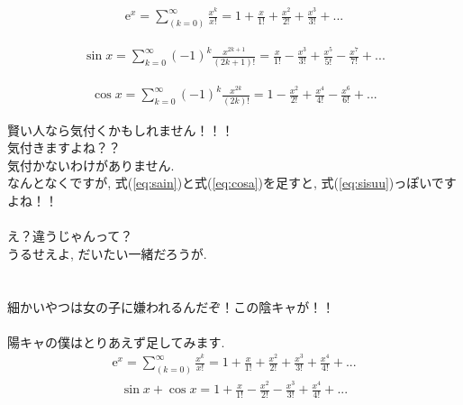 \documentclass[11pt,a4paper,uplatex]{ujreport} 	%
\begin{document}
\begin{eqnarray}
\mathrm{e}^x = \sum_{(k=0)}^\infty \frac{x^k}{x!} = 1 + \frac{x}{1!} + \frac{x^2}{2!} + \frac{x^3}{3!} + ...
\label{eq:sisuu}
\end{eqnarray}

\begin{eqnarray}
\sin x = \sum_{k=0}^{\infty}(-1)^k \frac{x^{2k + 1}}{(2k + 1)!} = \frac{x}{1!} - \frac{x^3}{3!} + \frac{x^5}{5!} - \frac{x^7}{7!} +  ...
\label{eq:sain}
\end{eqnarray}

\begin{eqnarray}
\cos x = \sum_{k=0}^\infty(-1)^k \frac{x^{2k}}{(2k)!} = 1 - \frac{x^2}{2!} + \frac{x^4}{4!} - \frac{x^6}{6!} + ...
\label{eq:cosa}
\end{eqnarray}

賢い人なら気付くかもしれません！！！\\
気付きますよね？？\\
気付かないわけがありません.\\
なんとなくですが, 式(\ref{eq:sain})と式(\ref{eq:cosa})を足すと, 式(\ref{eq:sisuu})っぽいですよね！！\\
\\
え？違うじゃんって？\\
うるせえよ, だいたい一緒だろうが.\\
\\
\\
細かいやつは女の子に嫌われるんだぞ！この陰キャが！！\\
\\
陽キャの僕はとりあえず足してみます.
\\
\begin{eqnarray}
\mathrm{e}^x = \sum_{(k=0)}^\infty \frac{x^k}{x!} = 1 + \frac{x}{1!} + \frac{x^2}{2!} + \frac{x^3}{3!} + \frac{x^4}{4!} + ...
\end{eqnarray}
\begin{eqnarray}
\sin x + \cos x = 1 + \frac{x}{1!} - \frac{x^2}{2!} - \frac{x^3}{3!} + \frac{x^4}{4!} + ...
\label{eq:mix}
\end{eqnarray}
\end{document}
